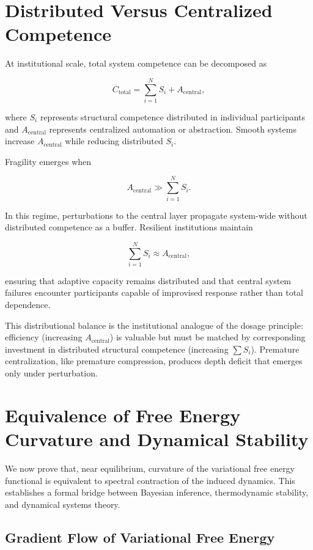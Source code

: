 \documentclass[11pt]{article}
\theoremstyle{remark}
\begin{document}
\section{Distributed Versus Centralized Competence}
\label{sec:distributed}

At institutional scale, total system competence can be decomposed as

\[
C_{\text{total}} = \sum_{i=1}^N S_i + A_{\text{central}},
\]

where $S_i$ represents structural competence distributed in individual participants and $A_{\text{central}}$ represents centralized automation or abstraction. Smooth systems increase $A_{\text{central}}$ while reducing distributed $S_i$.

Fragility emerges when

\[
A_{\text{central}} \gg \sum_{i=1}^N S_i.
\]

In this regime, perturbations to the central layer propagate system-wide without distributed competence as a buffer. Resilient institutions maintain

\[
\sum_{i=1}^N S_i \approx A_{\text{central}},
\]

ensuring that adaptive capacity remains distributed and that central system failures encounter participants capable of improvised response rather than total dependence.

This distributional balance is the institutional analogue of the dosage principle: efficiency (increasing $A_{\text{central}}$) is valuable but must be matched by corresponding investment in distributed structural competence (increasing $\sum S_i$). Premature centralization, like premature compression, produces depth deficit that emerges only under perturbation.

\section{Equivalence of Free Energy Curvature and Dynamical Stability}
\label{sec:hessian_jacobian}

We now prove that, near equilibrium, curvature of the variational free energy functional is equivalent to spectral contraction of the induced dynamics. This establishes a formal bridge between Bayesian inference, thermodynamic stability, and dynamical systems theory.

\subsection{Gradient Flow of Variational Free Energy}
\end{document}
